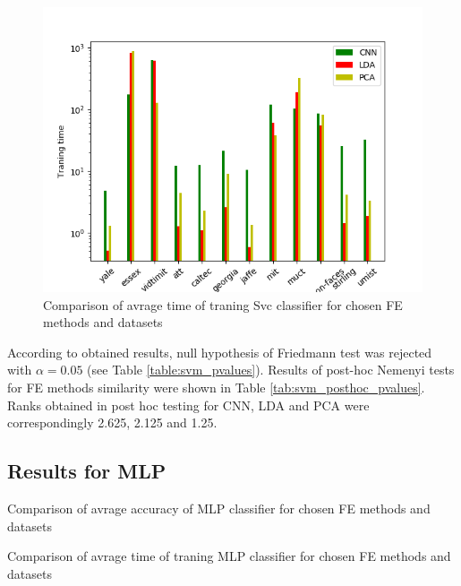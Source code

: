 \documentclass[a4paper, 10 pt, conference]{ieeeconf}
\begin{document}
\begin{figure}[!h]
    \centering
    \includegraphics[scale=0.875]{images/Svm_fit_time_comparison.png}
    \caption{Comparison of avrage time of traning Svc classifier for chosen FE methods and datasets}
    \label{fig:svm_fit_time_comparision}
\end{figure}

According to obtained results, null hypothesis of Friedmann test was rejected with $\alpha = 0.05$ (see Table \ref{table:svm_pvalues}). 
Results of post-hoc Nemenyi tests for FE methods similarity were shown in Table \ref{tab:svm_posthoc_pvalues}. Ranks obtained in post hoc testing for CNN, LDA and PCA were correspondingly 2.625, 2.125 and 1.25. 


\subsection{Results for MLP}


\begin{table}[!h]
    \centering
    \caption{Comparison of avrage accuracy of MLP classifier for chosen FE methods and datasets}
    
    \label{table:NN_acc_comparison}
\end{table}

\begin{table}[!h]
    \centering
    \caption{Comparison of avrage time of traning MLP classifier for chosen FE methods and datasets}
    
    \label{table:NN_fit_time_comparison}
\end{table}
\end{document}
